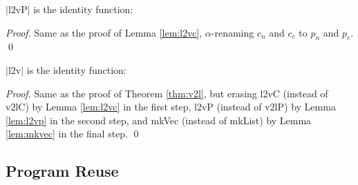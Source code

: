 \documentclass[a4paper,envcountsame,envcountsect]{llncs}
\newcommand{\labsec}[1]{\label{sec:#1}}
\newcommand{\refthm}[1]{Theorem \ref{thm:#1}}
\newcommand{\labthm}[1]{\label{thm:#1}}
\newcommand{\reflem}[1]{Lemma \ref{lem:#1}}
\newcommand{\lablem}[1]{\label{lem:#1}}
\newcommand{\earg}[1]{\,\,#1}
\newcommand{\erase}[1]{\ensuremath{\lvert #1 \rvert}}
\newcommand{\Erase}[1]{\ensuremath{\Big\lvert #1 \Big\rvert}}
\newcommand{\pair}[2]{\ensuremath{[ #1 ~,~ #2]}}
\newcommand{\fun}[1]{\lambda #1 .~}
\newcommand{\by}[1]{\text{#1}}
\newcommand{\name}[1]{\textrm{#1}}
\begin{document}
\begin{lemma}
\erase{\name{l2vP}} is the identity function:
\lablem{l2vp}
\end{lemma}

\begin{proof}
{\small
  Same as the proof of \reflem{l2vc},
  $\alpha$-renaming $c_n$ and $c_c$ to
  $p_n$ and $p_c$. \qed
}
\end{proof}

\begin{theorem}
\erase{\name{l2v}} is the identity function:
\labthm{l2v}
\end{theorem}

\begin{proof}
{\small
  Same as the proof of \refthm{v2l}, but erasing
  \name{l2vC} (instead of \name{v2lC})
  by \reflem{l2vc} in the first step,
  \name{l2vP} (instead of \name{v2lP})
  by \reflem{l2vp} in the second step, and
  \name{mkVec} (instead of \name{mkList})
  by \reflem{mkvec} in the final step. \qed
}
\end{proof}

\subsection{Program Reuse}
\labsec{vecreuse:progreuse}
\end{document}
